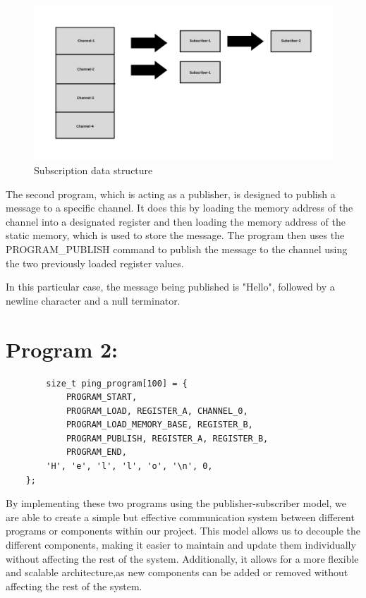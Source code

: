 \documentclass[12pt]{report}
\begin{document}
    \begin{figure}
    \begin{center}
    \includegraphics[width=12cm]{images/data-arch.png}
    \end{center}
    \caption{Subscription data structure}
    \label{fig:fig3}
    \end{figure}


    The second program, which is acting as a publisher, is designed to publish a message to a specific channel.
    It does this by loading the memory address of the channel into a designated register and then loading the memory address
    of the static memory, which is used to store the message. The program then uses the PROGRAM\_PUBLISH command to publish 
    the message to the channel using the two previously loaded register values. 

    In this particular case, the message being published is "Hello", followed by a newline character and a null terminator. 

    \pagebreak
    \section{Program 2:}
    \begin{verbatim}
        size_t ping_program[100] = { 
            PROGRAM_START, 
            PROGRAM_LOAD, REGISTER_A, CHANNEL_0,
            PROGRAM_LOAD_MEMORY_BASE, REGISTER_B,     
            PROGRAM_PUBLISH, REGISTER_A, REGISTER_B, 
            PROGRAM_END, 
        'H', 'e', 'l', 'l', 'o', '\n', 0, 
    }; 
    \end{verbatim}

    By implementing these two programs using the publisher-subscriber model, we are able to create a simple but effective communication 
    system between different programs or components within our project. This model allows us to decouple the different components, 
    making it easier to maintain and update them individually without affecting the rest of the system. Additionally, 
    it allows for a more flexible and scalable architecture,as new components can be added or removed without affecting the rest of the system. 
\end{document}
